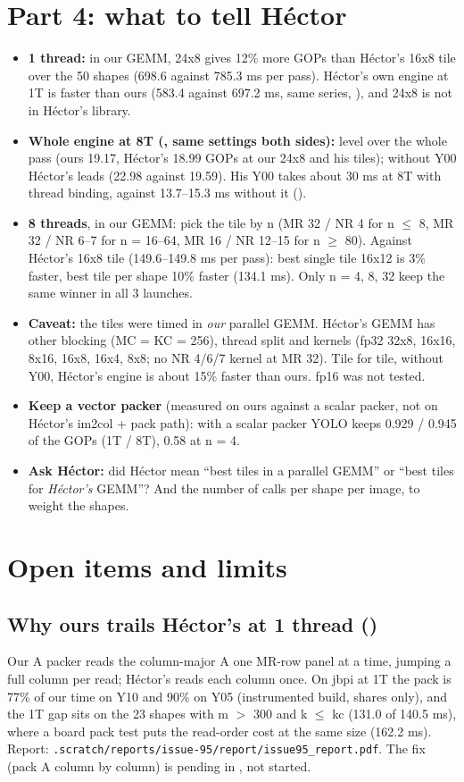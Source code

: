 \section{Part 4: what to tell H\'ector}
\begin{itemize}\setlength\itemsep{2pt}
\item \textbf{1 thread:} in our GEMM, 24x8 gives 12\% more GOPs than H\'ector's 16x8 tile over the 50 shapes (698.6 against 785.3 ms per pass). H\'ector's own engine at 1T is faster than ours (583.4 against 697.2 ms, same series, ), and 24x8 is not in H\'ector's library.
\item \textbf{Whole engine at 8T (, same settings both sides):} level over the whole pass (ours 19.17, H\'ector's 18.99 GOPs at our 24x8 and his tiles); without Y00 H\'ector's leads (22.98 against 19.59). His Y00 takes about 30 ms at 8T with thread binding, against 13.7--15.3 ms without it ().
\item \textbf{8 threads}, in our GEMM: pick the tile by n (MR 32 / NR 4 for n $\le$ 8, MR 32 / NR 6--7 for n = 16--64, MR 16 / NR 12--15 for n $\ge$ 80). Against H\'ector's 16x8 tile (149.6--149.8 ms per pass): best single tile 16x12 is 3\% faster, best tile per shape 10\% faster (134.1 ms). Only n = 4, 8, 32 keep the same winner in all 3 launches.
\item \textbf{Caveat:} the tiles were timed in \emph{our} parallel GEMM. H\'ector's GEMM has other blocking (MC = KC = 256), thread split and kernels (fp32 32x8, 16x16, 8x16, 16x8, 16x4, 8x8; no NR 4/6/7 kernel at MR 32). Tile for tile, without Y00, H\'ector's engine is about 15\% faster than ours. fp16 was not tested.
\item \textbf{Keep a vector packer} (measured on ours against a scalar packer, not on H\'ector's im2col + pack path): with a scalar packer YOLO keeps 0.929 / 0.945 of the GOPs (1T / 8T), 0.58 at n = 4.
\item \textbf{Ask H\'ector:} did H\'ector mean ``best tiles in a parallel GEMM'' or ``best tiles for \emph{H\'ector's} GEMM''? And the number of calls per shape per image, to weight the shapes.
\end{itemize}

\section{Open items and limits}\label{sec:open}
\subsection*{Why ours trails H\'ector's at 1 thread ()}
Our A packer reads the column-major A one MR-row panel at a time, jumping a full column per read; H\'ector's reads each column once. On jbpi at 1T the pack is 77\% of our time on Y10 and 90\% on Y05 (instrumented build, shares only), and the 1T gap sits on the 23 shapes with m $>$ 300 and k $\le$ kc (131.0 of 140.5 ms), where a board pack test puts the read-order cost at the same size (162.2 ms). Report: \texttt{.scratch/reports/issue-95/report/issue95\_report.pdf}. The fix (pack A column by column) is pending in , not started.

